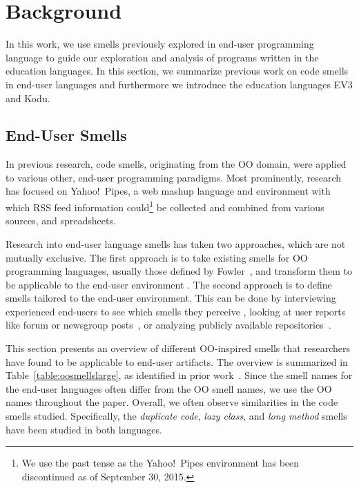 \documentclass[conference]{IEEEtran}
\begin{document}
\section{Background}
\label{sec:background}
In this work, we use smells previously explored in end-user programming language to guide our exploration and analysis of programs written in the education languages. In this section, we summarize previous work on code smells in end-user languages and furthermore we introduce the education languages EV3 and Kodu.

\subsection{End-User Smells}
\label{subsec:eusmells}
In previous research, code smells, originating from the OO domain, were applied to various other, end-user programming paradigms. 
Most prominently, research has focused on Yahoo!\ Pipes, a web mashup language and environment with which RSS feed information could\footnote{We use the past tense as the Yahoo!\ Pipes environment has been discontinued as of September 30, 2015.} be collected and combined from various sources, and spreadsheets.

Research into end-user language smells has taken two approaches, which are not mutually exclusive. The first approach is to take existing smells for OO programming languages, usually those defined by Fowler~\cite{Fowl1999}, and transform them to be applicable to the end-user environment \cite{Hermans2012inter,Hermans2012intra,Stolee2011,StoleeTSE2013, chambers2013smell}. The second approach is to define smells tailored to the end-user environment. This can be done by interviewing experienced end-users to see which smells they perceive \cite{chambers2013smell},  looking at user reports like forum or newsgroup posts~\cite{badame2012refactoring,chambers2013smell}, or  analyzing publicly available repositories~\cite{Stolee2011,StoleeTSE2013,Hermans2012intra}.

This section presents an overview of different OO-inspired smells that researchers have found to be applicable to end-user artifacts. The overview is summarized in Table~\ref{table:oosmellslarge}, as identified in prior work~\cite{Stolee2011,StoleeTSE2013,Hermans2012intra, Hermans2012inter}.
 Since the smell names for the end-user languages often differ from the OO smell names, we use the OO names throughout the paper. Overall, we often observe similarities in the code smells studied. Specifically, the \emph{duplicate code}, \emph{lazy class}, and \emph{long method} smells  have been studied in both languages.  
 
\end{document}
